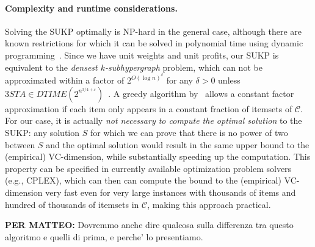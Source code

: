 \paragraph{Complexity and runtime considerations.} Solving the SUKP optimally
is NP-hard in the general case, although there are known restrictions for which
it can be solved in polynomial time using dynamic
programming~\citep{GoldschmidtNY94}. Since we have unit weights and unit
profits, our SUKP is equivalent to the \emph{densest $k$-subhypergraph} problem,
which can not be approximated within a factor of $2^{O(\log n)^\delta}$ for any
$\delta>0$ unless $3STA \in
DTIME(2^{n^{3/4+\varepsilon}})$~\citep{HajiaghayiJKLMRSV06}. A greedy algorithm
by~\citet{Arulselvan14} allows a constant factor approximation if each item only
appears in a constant fraction of itemsets of $\mathcal{C}$. For our case, it is
actually \emph{not necessary to compute the optimal solution} to the SUKP: any
solution $S$ for which we can prove that there is no power of two
between $S$ and the optimal solution would result in the same upper
bound to the (empirical) VC-dimension, while substantially speeding up the
computation. This property can be specified in currently available optimization
problem solvers (e.g., CPLEX), which can then can compute the bound to the
(empirical) VC-dimension very fast even for very large instances with thousands
of items and hundred of thousands of itemsets in $\mathcal{C}$, making this
approach practical.

{\bf PER MATTEO:} Dovremmo anche dire qualcosa sulla differenza tra questo
algoritmo e quelli di prima, e perche' lo presentiamo.
